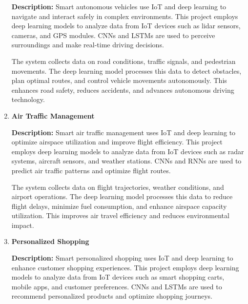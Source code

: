 \documentclass{article}
\begin{document}
\begin{enumerate}[label=\textbf{\arabic*.}, leftmargin=*]
\textbf{Description:}
Smart autonomous vehicles use IoT and deep learning to navigate and interact safely in complex environments. This project employs deep learning models to analyze data from IoT devices such as lidar sensors, cameras, and GPS modules. CNNs and LSTMs are used to perceive surroundings and make real-time driving decisions.

The system collects data on road conditions, traffic signals, and pedestrian movements. The deep learning model processes this data to detect obstacles, plan optimal routes, and control vehicle movements autonomously. This enhances road safety, reduces accidents, and advances autonomous driving technology.



\vspace{24pt} %
\item \textbf{Air Traffic Management}

\textbf{Description:}
Smart air traffic management uses IoT and deep learning to optimize airspace utilization and improve flight efficiency. This project employs deep learning models to analyze data from IoT devices such as radar systems, aircraft sensors, and weather stations. CNNs and RNNs are used to predict air traffic patterns and optimize flight routes.

The system collects data on flight trajectories, weather conditions, and airport operations. The deep learning model processes this data to reduce flight delays, minimize fuel consumption, and enhance airspace capacity utilization. This improves air travel efficiency and reduces environmental impact.



\vspace{24pt} %
\item \textbf{Personalized Shopping}

\textbf{Description:}
Smart personalized shopping uses IoT and deep learning to enhance customer shopping experiences. This project employs deep learning models to analyze data from IoT devices such as smart shopping carts, mobile apps, and customer preferences. CNNs and LSTMs are used to recommend personalized products and optimize shopping journeys.


\end{enumerate}
\end{document}
